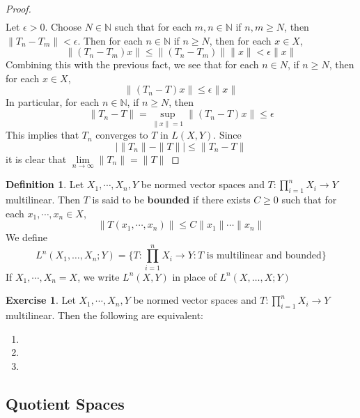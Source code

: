 \documentclass[12pt]{amsart}
\theoremstyle{definition}
\newtheorem{defn}[definition]{Definition}
\theoremstyle{remark}
\theoremstyle{definition}
\newtheorem{ex}[definition]{Exercise}
\newcommand{\ep}{\epsilon}
\newcommand{\N}{\mathbb{N}}
\newcommand{\limn}{\lim \limits_{n \rightarrow \infty}}
\begin{document}
\begin{proof}
\begin{align*}
		\end{align*} 
		Let $\ep >0 $. Choose $N \in \N$ such that for each $m, n \in \N$ if $n,m \geq N$, then $\|T_n - T_m \|< \ep$. Then for each $n \in \N$ if $n \geq N$, then for each $x \in X$, $$\|(T_n-T_m)x\|\leq \|(T_n-T_m)\|\|x \|< \ep \|x\|$$ Combining this with the previous fact, we see that for each $n \in N$, if $n \geq N$, then for each $x \in X$, $$\|(T_n -T) x\|\leq \ep \|x \|$$ In particular, for each $n \in \N$, if $n \geq N$, then $$ \|T_n -T \|= \sup\limits_{\|x \|= 1}\|(T_n - T)x \|\leq \ep$$ This implies that $T_n$ converges to $T$ in $L(X,Y)$. 
		Since $$\big\vert \|T_n \|- \|T \|\big \vert \leq \|T_n - T \|$$ it is clear that $\limn \|T_n \|= \|T \|$
	\end{proof}
	
	\begin{defn}
	Let $X_1, \cdots, X_n, Y$ be normed vector spaces and $T: \prod\limits_{i=1}^n X_i \rightarrow Y$ multilinear. Then $T$ is said to be \textbf{bounded} if there exists $C \geq 0$ such that for each $x_1, \cdots, x_n \in X$, $$\|T(x_1, \cdots, x_n)\| \leq C \|x_1\| \cdots \|x_n\|$$
	We define $$L^n (X_1, \dots, X_n; Y) = \bigg\{T: \prod\limits_{i=1}^n X_i \rightarrow Y: T \text{ is multilinear and bounded}\bigg \}$$ 
	If $X_1, \cdots, X_n = X$, we write $L^n(X,Y)$ in place of $L^n (X, \dots, X; Y) $
	\end{defn}
	
	\begin{ex}
	Let $X_1, \cdots, X_n, Y$ be normed vector spaces and $T: \prod\limits_{i=1}^n X_i \rightarrow Y$ multilinear. Then the following are equivalent:
	\begin{enumerate}
	\item 
	\item 
	\item
	\end{enumerate}
	\end{ex}
	
	
	\newpage
	
	
	
	
	
	
	
	
	
	
	
	
	
	
	
	
	
	
	
	
	
	
	
	
	\subsection{Quotient Spaces}	
	
\end{document}
